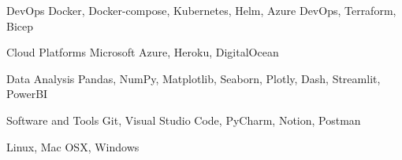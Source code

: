 \cvsectiondivider[0.5\textwidth]


\begin{cvskills}

\cvskill
{DevOps} %
{Docker, Docker-compose, Kubernetes, Helm, Azure DevOps, Terraform, Bicep} %

\cvskill
{Cloud Platforms} %
{Microsoft Azure, Heroku, DigitalOcean} %

\end{cvskills}



\cvsectiondivider[0.5\textwidth]


\begin{cvskills}
\cvskill
{Data Analysis}
{Pandas, NumPy, Matplotlib, Seaborn, Plotly, Dash, Streamlit, PowerBI} %


\cvskill
{Software and Tools} %
{Git, Visual Studio Code, PyCharm, Notion, Postman} %


\cvskill
{} %
{Linux, Mac OSX, Windows} %
\end{cvskills}